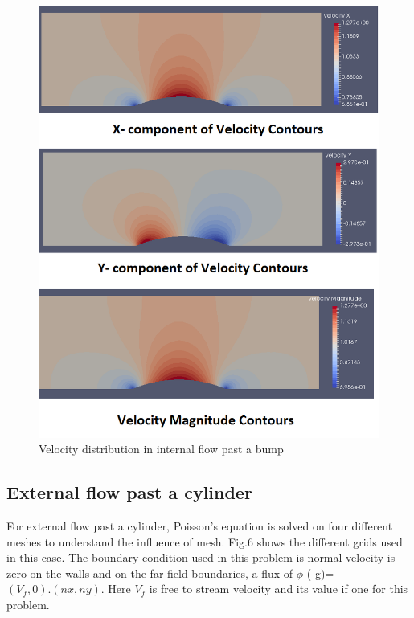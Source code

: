 \documentclass[12pt]{elsarticle}
\begin{document}
	
	\begin{figure}[h] \label{bum_vel}
		\centering\includegraphics[width=1.0\linewidth]{figure_grid1_vel}
		\caption{Velocity distribution in internal flow past a bump}
	\end{figure}
	\clearpage
	
	\subsection{External flow past a cylinder}
	For external flow past a cylinder, Poisson’s equation is solved on four different meshes to understand the influence of mesh. Fig.6 shows the different grids used in this case. The boundary condition used in this problem is normal velocity is zero on the walls and on the far-field boundaries, a flux of $\phi$ ( g)=$(V_f,0).(nx,ny)$. Here $V_f$ is free to stream velocity and its value if one for this problem.
	
\end{document}
